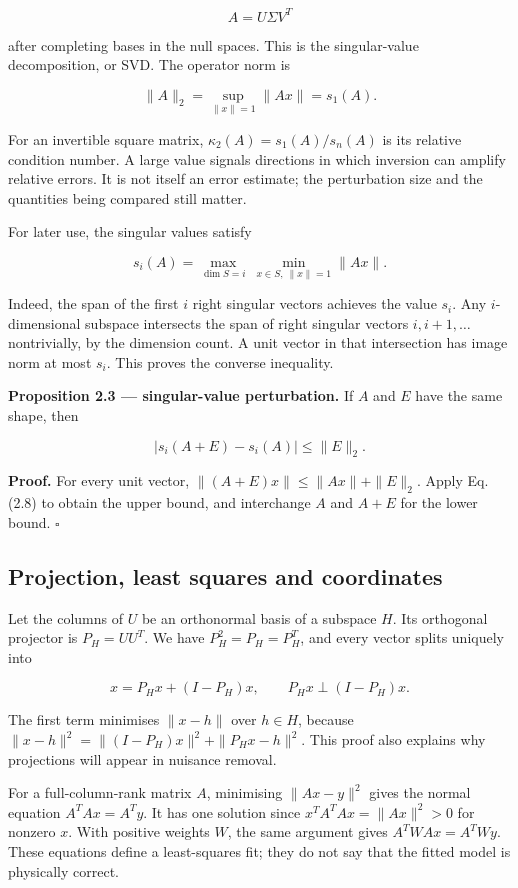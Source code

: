\documentclass[
  11pt,
  a4paper]{article}
\begin{document}
\[
A=U\Sigma V^T
\tag{2.6}
\]

after completing bases in the null spaces. This is the singular-value decomposition, or SVD. The operator norm is

\[
\|A\|_2=\sup_{\|x\|=1}\|Ax\|=s_1(A).
\tag{2.7}
\]

For an invertible square matrix, \(\kappa_2(A)=s_1(A)/s_n(A)\) is its relative condition number. A large value signals directions in which inversion can amplify relative errors. It is not itself an error estimate; the perturbation size and the quantities being compared still matter.

For later use, the singular values satisfy

\[
s_i(A)=\max_{\dim S=i}\ \min_{x\in S,\ \|x\|=1}\|Ax\|.
\tag{2.8}
\]

Indeed, the span of the first \(i\) right singular vectors achieves the value \(s_i\). Any \(i\)-dimensional subspace intersects the span of right singular vectors \(i,i+1,\ldots\) nontrivially, by the dimension count. A unit vector in that intersection has image norm at most \(s_i\). This proves the converse inequality.

\textbf{Proposition 2.3 --- singular-value perturbation.} If \(A\) and \(E\) have the same shape, then

\[
|s_i(A+E)-s_i(A)|\le\|E\|_2.
\tag{2.9}
\]

\textbf{Proof.} For every unit vector, \(\|(A+E)x\|\le\|Ax\|+\|E\|_2\). Apply Eq. (2.8) to obtain the upper bound, and interchange \(A\) and \(A+E\) for the lower bound. \(\square\)

\hypertarget{projection-least-squares-and-coordinates}{%
\subsection{Projection, least squares and coordinates}\label{projection-least-squares-and-coordinates}}

Let the columns of \(U\) be an orthonormal basis of a subspace \(H\). Its orthogonal projector is \(P_H=UU^T\). We have \(P_H^2=P_H=P_H^T\), and every vector splits uniquely into

\[
x=P_Hx+(I-P_H)x,
\qquad P_Hx\perp(I-P_H)x.
\tag{2.10}
\]

The first term minimises \(\|x-h\|\) over \(h\in H\), because
\(\|x-h\|^2=\|(I-P_H)x\|^2+\|P_Hx-h\|^2\). This proof also explains why projections will appear in nuisance removal.

For a full-column-rank matrix \(A\), minimising \(\|Ax-y\|^2\) gives the normal equation \(A^TAx=A^Ty\). It has one solution since \(x^TA^TAx=\|Ax\|^2>0\) for nonzero \(x\). With positive weights \(W\), the same argument gives \(A^TWAx=A^TWy\). These equations define a least-squares fit; they do not say that the fitted model is physically correct.
\end{document}
